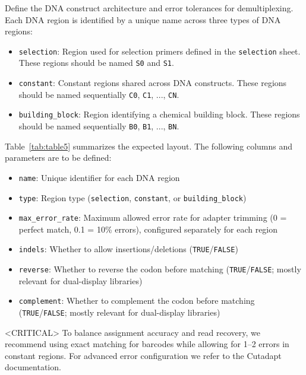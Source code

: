 


Define the DNA construct architecture and error tolerances for demultiplexing. Each DNA region is identified by a unique name across three types of DNA regions:

\begin{itemize}
  \item \texttt{selection}: Region used for selection primers defined in the \texttt{selection} sheet. These regions should be named \texttt{S0} and \texttt{S1}.
  \item \texttt{constant}: Constant regions shared across DNA constructs. These regions should be named sequentially \texttt{C0}, \texttt{C1}, ..., \texttt{CN}.
  \item \texttt{building\_block}: Region identifying a chemical building block. These regions should be named sequentially \texttt{B0}, \texttt{B1}, ..., \texttt{BN}.
\end{itemize}

Table~\ref{tab:table5} summarizes the expected layout. The following columns and parameters are to be defined: 

\begin{itemize}
  \item \texttt{name}: Unique identifier for each DNA region
  \item \texttt{type}: Region type (\texttt{selection}, \texttt{constant}, or \texttt{building\_block})
  \item \texttt{max\_error\_rate}: Maximum allowed error rate for adapter trimming (0 = perfect match, 0.1 = 10\% errors), configured separately for each region
  \item \texttt{indels}: Whether to allow insertions/deletions (\texttt{TRUE}/\texttt{FALSE})
  \item \texttt{reverse}: Whether to reverse the codon before matching (\texttt{TRUE}/\texttt{FALSE}; mostly relevant for dual-display libraries)
  \item \texttt{complement}: Whether to complement the codon before matching (\texttt{TRUE}/\texttt{FALSE}; mostly relevant for dual-display libraries)
\end{itemize}



<CRITICAL> To balance assignment accuracy and read recovery, we recommend using exact matching for barcodes while allowing for 1--2 errors in constant regions. For advanced error configuration we refer to the Cutadapt \cite{martin_cutadaptremovesadapter_2011} documentation.


